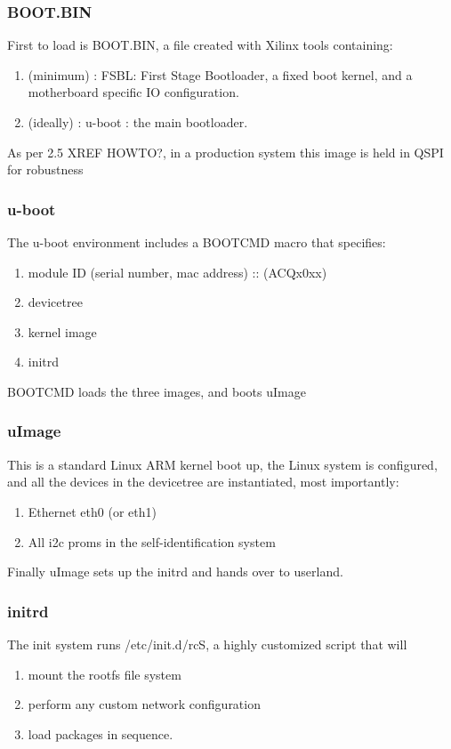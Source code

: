 \documentclass[]{article}
\begin{document}
\subsubsection{BOOT.BIN}
First to load is BOOT.BIN, a file created with Xilinx tools containing:
\begin{enumerate}
    \item (minimum) : FSBL: First Stage Bootloader, a fixed boot kernel, and a motherboard specific IO configuration.
    \item (ideally) : u-boot : the main bootloader.
\end{enumerate}
As per 2.5 XREF HOWTO?, in a production system this image is held in QSPI for robustness

\subsubsection{u-boot}
The u-boot environment includes a BOOTCMD macro that specifies:
\begin{enumerate}
    \item module ID (serial number, mac address) :: (ACQx0xx)
    \item devicetree
    \item kernel image
    \item initrd        
\end{enumerate}
BOOTCMD loads the three images, and boots uImage

\subsubsection{uImage}
This is a standard Linux ARM kernel boot up, the Linux system is configured, and all the devices in the devicetree are instantiated, most importantly:
\begin{enumerate}
    \item Ethernet eth0 (or eth1)
    \item All i2c proms in the self-identification system    
\end{enumerate}
Finally uImage sets up the initrd and hands over to userland.

\subsubsection{initrd}
The init system runs /etc/init.d/rcS, a highly customized script that will
\begin{enumerate}
    \item mount the rootfs file system
    \item perform any custom network configuration
    \item load packages in sequence.
\end{enumerate}
\end{document}
